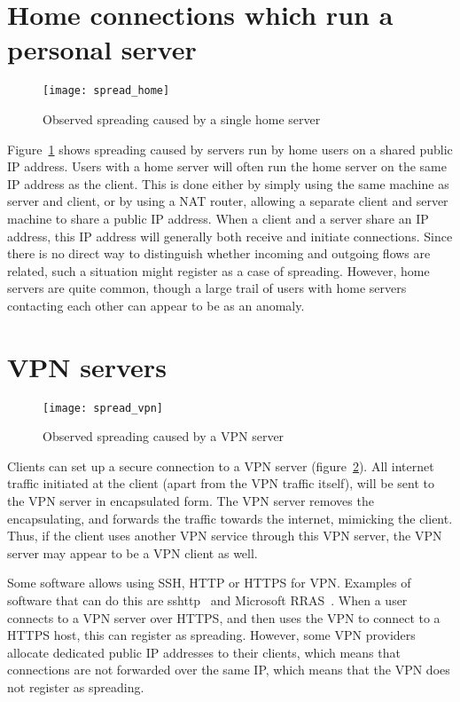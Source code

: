 \section{Home connections which run a personal server}
\begin{figure}[h]
	\caption{Observed spreading caused by a single home server}
	\label{fig:spread_home}
	\centering
		\texttt{[image: spread\_home]}
\end{figure}

Figure~\ref{fig:spread_home} shows \gls{spreading} caused by servers run by home users on a shared public IP address.
Users with a home server will often run the home server on the same IP address as the client.
This is done either by simply using the same machine as server and client,
 or by using a NAT router, allowing a separate client and server machine to share a public IP address.
When a client and a server share an IP address, this IP address will generally both receive and initiate connections.
Since there is no direct way to distinguish whether incoming and outgoing flows are related,
 such a situation might register as a case of \gls{spreading}.
However, home servers are quite common, though a large trail of users with home servers contacting each other can appear to be as an anomaly.


\section{VPN servers}
\begin{figure}[h]
	\caption{Observed spreading caused by a VPN server}
	\label{fig:spread_vpn}
	\centering
		\texttt{[image: spread\_vpn]}
\end{figure}

Clients can set up a secure connection to a VPN server (figure~\ref{fig:spread_vpn}).
All internet traffic initiated at the client (apart from the VPN traffic itself), will be sent to the VPN server in encapsulated form.
The VPN server removes the encapsulating, and forwards the traffic towards the internet, mimicking the client.
Thus, if the client uses another VPN service through this VPN server, the VPN server may appear to be a VPN client as well.

Some software allows using SSH, HTTP or HTTPS for VPN.
Examples of software that can do this are sshttp~\cite{github:stealth:sshttp} and Microsoft RRAS~\cite{rras}.
When a user connects to a VPN server over HTTPS, and then uses the VPN to connect to a HTTPS host, this can register as \gls{spreading}.
However, some VPN providers allocate dedicated public IP addresses to their clients,
 which means that connections are not forwarded over the same IP, which means that the VPN does not register as \gls{spreading}.


